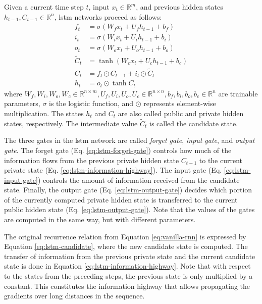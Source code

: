 Given a current time step $t$, input $x_t \in \mathbb{R}^m$, and previous
hidden states $h_{t-1}, C_{t-1} \in \mathbb{R}^n$, \ac{lstm} networks proceed
as follows:
%
\begin{align}
  f_t &= \sigma\left(W_f x_t + U_f h_{t-1} + b_f\right) \label{eq:lstm-forget-gate} \\
  i_t &= \sigma\left(W_i x_t + U_i h_{t-1} + b_i\right) \label{eq:lstm-input-gate} \\
  o_t &= \sigma\left(W_o x_t + U_o h_{t-1} + b_o\right) \label{eq:lstm-output-gate} \\
  \tilde{C}_t &= \tanh \left( W_c x_t + U_c h_{t-1} + b_c \right) \label{eq:lstm-candidate} \\
  C_t &= f_t \odot C_{t-1} + i_t \odot \tilde{C}_t \label{eq:lstm-information-highway} \\
  h_t &= o_t \odot \tanh C_t \label{eq:lstm-hidden-state}
\end{align}
%
where $W_f, W_i, W_o, W_c \in \mathbb{R}^{n \times m}, U_f, U_i, U_o, U_c \in
\mathbb{R}^{n \times n}, b_f, b_i, b_o, b_c \in \mathbb{R}^n$ are trainable
parameters, $\sigma$ is the logistic function, and $\odot$ represents
element-wise multiplication. The states $h_t$ and $C_t$ are also called public
and private hidden states, respectively. The intermediate value $\tilde{C}_t$ is
called the candidate state.

The three gates in the \ac{lstm} network are called \emph{forget gate},
\emph{input gate}, and \emph{output gate}. The forget gate (Eq.
\ref{eq:lstm-forget-gate}) controls how much of the information flows from the
previous private hidden state $C_{t-1}$ to the current private state (Eq.
\ref{eq:lstm-information-highway}). The input gate (Eq.
\ref{eq:lstm-input-gate}) controls the amount of information received from the
candidate state. Finally, the output gate (Eq. \ref{eq:lstm-output-gate})
decides which portion of the currently computed private hidden state is
transferred to the current public hidden state
(Eq. \ref{eq:lstm-output-gate}). Note that the values of the gates are computed
in the same way, but with different parameters.

The original recurrence relation from Equation \ref{eq:vanilla-rnn} is expressed
by Equation \ref{eq:lstm-candidate}, where the new candidate state is
computed. The transfer of information from the previous private state and the
current candidate state is done in Equation
\ref{eq:lstm-information-highway}. Note that with respect to the states from the
preceding steps, the previous state is only multiplied by a constant. This
constitutes the information highway that allows propagating the gradients over
long distances in the sequence.

